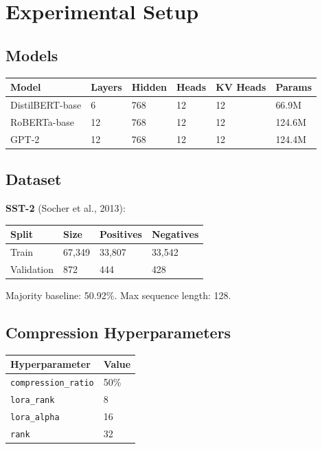 \section{Experimental Setup}

\subsection{Models}

\begin{table}[H]
\centering
\small
\begin{tabular}{llllll}
\toprule
\textbf{Model} & \textbf{Layers} & \textbf{Hidden} & \textbf{Heads} & \textbf{KV Heads} & \textbf{Params} \\
\midrule
DistilBERT-base & 6 & 768 & 12 & 12 & 66.9M \\
RoBERTa-base & 12 & 768 & 12 & 12 & 124.6M \\
GPT-2 & 12 & 768 & 12 & 12 & 124.4M \\
\bottomrule
\end{tabular}
\end{table}

\subsection{Dataset}

\textbf{SST-2} (Socher et al., 2013):

\begin{table}[H]
\centering
\small
\begin{tabular}{llll}
\toprule
\textbf{Split} & \textbf{Size} & \textbf{Positives} & \textbf{Negatives} \\
\midrule
Train & 67,349 & 33,807 & 33,542 \\
Validation & 872 & 444 & 428 \\
\bottomrule
\end{tabular}
\end{table}

Majority baseline: 50.92\%. Max sequence length: 128.

\subsection{Compression Hyperparameters}

\begin{table}[H]
\centering
\small
\begin{tabular}{ll}
\toprule
\textbf{Hyperparameter} & \textbf{Value} \\
\midrule
\texttt{compression\_ratio} & 50\% \\
\texttt{lora\_rank} & 8 \\
\texttt{lora\_alpha} & 16 \\
\texttt{rank} & 32 \\
\bottomrule
\end{tabular}
\end{table}

